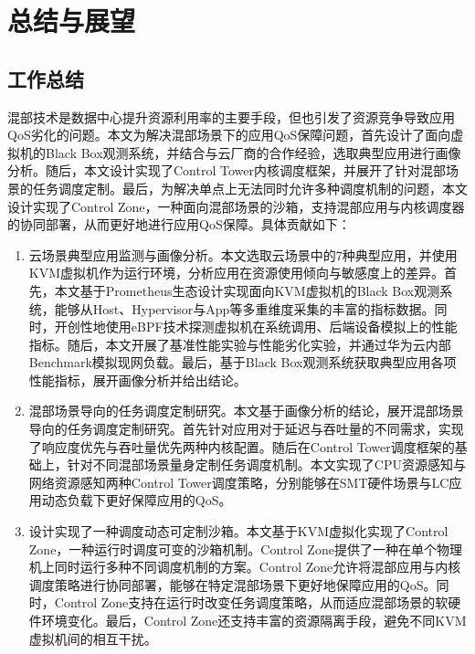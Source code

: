 \chapter{总结与展望}\label{chap:theories_tech}

\section{工作总结}

混部技术是数据中心提升资源利用率的主要手段，但也引发了资源竞争导致应用QoS劣化的问题。本文为解决混部场景下的应用QoS保障问题，首先设计了面向虚拟机的Black Box观测系统，并结合与云厂商的合作经验，选取典型应用进行画像分析。随后，本文设计实现了Control Tower内核调度框架，并展开了针对混部场景的任务调度定制。最后，为解决单点上无法同时允许多种调度机制的问题，本文设计实现了Control Zone，一种面向混部场景的沙箱，支持混部应用与内核调度器的协同部署，从而更好地进行应用QoS保障。具体贡献如下：

\begin{enumerate}

    \item 云场景典型应用监测与画像分析。本文选取云场景中的7种典型应用，并使用KVM虚拟机作为运行环境，分析应用在资源使用倾向与敏感度上的差异。首先，本文基于Prometheus生态设计实现面向KVM虚拟机的Black Box观测系统，能够从Host、Hypervisor与App等多重维度采集的丰富的指标数据。同时，开创性地使用eBPF技术探测虚拟机在系统调用、后端设备模拟上的性能指标。随后，本文开展了基准性能实验与性能劣化实验，并通过华为云内部Benchmark模拟现网负载。最后，基于Black Box观测系统获取典型应用各项性能指标，展开画像分析并给出结论。

    \item 混部场景导向的任务调度定制研究。本文基于画像分析的结论，展开混部场景导向的任务调度定制研究。首先针对应用对于延迟与吞吐量的不同需求，实现了响应度优先与吞吐量优先两种内核配置。随后在Control Tower调度框架的基础上，针对不同混部场景量身定制任务调度机制。本文实现了CPU资源感知与网络资源感知两种Control Tower调度策略，分别能够在SMT硬件场景与LC应用动态负载下更好保障应用的QoS。

    \item 设计实现了一种调度动态可定制沙箱。本文基于KVM虚拟化实现了Control Zone，一种运行时调度可变的沙箱机制。Control Zone提供了一种在单个物理机上同时运行多种不同调度机制的方案。Control Zone允许将混部应用与内核调度策略进行协同部署，能够在特定混部场景下更好地保障应用的QoS。同时，Control Zone支持在运行时改变任务调度策略，从而适应混部场景的软硬件环境变化。最后，Control Zone还支持丰富的资源隔离手段，避免不同KVM虚拟机间的相互干扰。

\end{enumerate}

